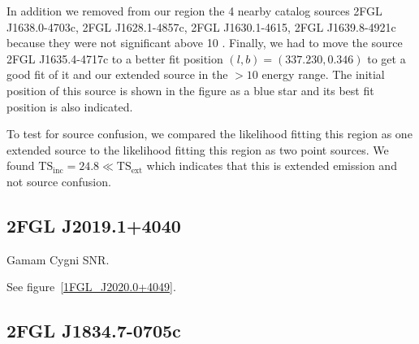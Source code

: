 \documentclass[12pt,preprint]{aastex}
\newcommand{\gev}{\text{GeV}\xspace}
\newcommand{\tsext}{{\ensuremath{\text{TS}_\text{ext}}}\xspace}
\newcommand{\tsinc}{\ensuremath{\text{TS}_\text{inc}}\xspace}
\begin{document}
In addition we removed from our region the 4 nearby catalog sources
2FGL J1638.0-4703c, 2FGL J1628.1-4857c, 2FGL  J1630.1-4615, 2FGL
J1639.8-4921c because they were not significant above 10 \gev. Finally,
we had to move the source 2FGL J1635.4-4717c to a better fit position
$(l,b)=(337.230,0.346)$ to get a good fit of it and our extended source in
the $>10$ \gev energy range. The initial position of this source is shown
in the figure as a blue star and its best fit position is also indicated.

To test for source confusion, we compared the likelihood fitting this
region as one extended source to the likelihood fitting this region as
two point sources. We found $\tsinc=24.8\ll\tsext$ which indicates that
this is extended emission and not source confusion.



\subsection{2FGL J2019.1+4040}

Gamam Cygni SNR. 




See figure~\ref{1FGL_J2020.0+4049}.


\subsection{2FGL J1834.7-0705c}

\end{document}
